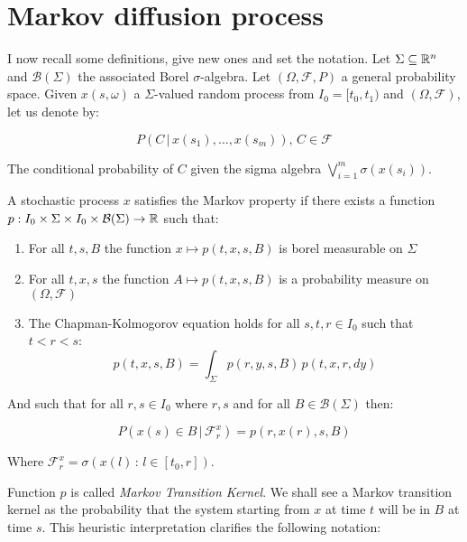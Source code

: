 \section{Markov diffusion process}

I now recall some definitions, give new ones and set the notation. Let $\Sigma\subseteq\mathbb{R}^n$ and $\mathcal{B}(\Sigma)$ 
the associated Borel $\sigma$-algebra. Let $(\Omega, \mathcal{F}, P)$ a general probability space. 
Given $x(s,\omega)$ a $\Sigma$-valued random process from $I_0=[t_0,t_1)$ and $(\Omega,\mathcal{F})$, let us denote by:

\[P(C\,|\,x(s_1),\dots,x(s_m)),\,C\in\mathcal{F}\]

The conditional probability of $C$ given the sigma algebra $\bigvee_{i=1}^m\sigma(x(s_i))$.

\begin{definition}\label{2-1-markovprocessdef}
    A stochastic process $x$ satisfies the Markov property if there exists a function 
    $p:I_0\times \Sigma\times I_0\times  \mathcal{B}(\Sigma)\rightarrow \mathbb{R}$ such that:

    \begin{enumerate}
        \item For all $t,s,B$ the function $x\mapsto p(t,x,s,B)$ is borel measurable on $\Sigma$
        \item For all $t,x,s$ the function $A\mapsto p(t,x,s,B)$ is a probability measure on $(\Omega,\mathcal{F})$
        \item The Chapman-Kolmogorov equation holds for all $s,t,r\in I_0$ such that $t<r<s$:
        \begin{equation}\label{2-1-markovprocessdef-chapkol}
            p(t,x,s,B) = \int_{\Sigma} p(r,y,s,B)\,p(t,x,r,dy)
        \end{equation}
    \end{enumerate}

    And such that for all $r,s\in I_0$ where $r,s$ and for all $B\in\mathcal{B}(\Sigma)$ then:

    \begin{equation}\label{2-1-markovprocessdef-condonp}
        P(x(s)\in B\,|\,\mathcal{F}_r^x) = p(r,x(r),s,B)
    \end{equation}

    Where $\mathcal{F}_r^x=\sigma\left(x(l)\,:\,l\in[t_0,r]\right)$.
\end{definition}

Function $p$ is called \textit{Markov Transition Kernel}. We shall see a Markov transition kernel as 
the probability that the system starting from $x$ at time $t$ will be in $B$ at time $s$. This heuristic interpretation 
clarifies the following notation:

